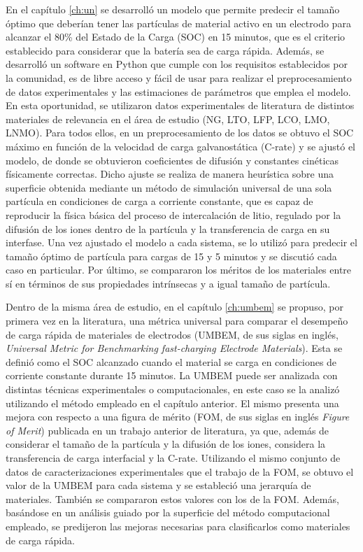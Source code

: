En el capítulo \ref{ch:un} se desarrolló un modelo que permite predecir el tamaño
óptimo que deberían tener las partículas de material activo en un electrodo para 
alcanzar el 80\% del Estado de la Carga (SOC) en 15 minutos, que es el criterio
establecido para considerar que la batería sea de carga rápida. Además, se 
desarrolló un software en Python que cumple con los requisitos establecidos por 
la comunidad, es de libre acceso y fácil de usar para realizar el preprocesamiento
de datos experimentales y las estimaciones de parámetros que emplea el modelo. En esta oportunidad, se 
utilizaron datos experimentales de literatura de distintos materiales de 
relevancia en el área de estudio (NG, LTO, LFP, LCO, LMO, LNMO). Para todos ellos,
en un preprocesamiento de los datos se obtuvo el SOC máximo en función de la 
velocidad de carga galvanostática (C-rate) y se ajustó el modelo, de donde 
se obtuvieron coeficientes de difusión y constantes cinéticas físicamente 
correctas. Dicho ajuste se realiza de manera heurística sobre una superficie 
obtenida mediante un método de simulación universal de una sola partícula en 
condiciones de carga a corriente constante, que es capaz de reproducir la física 
básica del proceso de intercalación de litio, regulado por la difusión de los 
iones dentro de la partícula y la transferencia de carga en su interfase.
Una vez ajustado el modelo a cada sistema, se lo utilizó para predecir el tamaño
óptimo de partícula para cargas de 15 y 5 minutos y se discutió cada caso en 
particular. Por último, se compararon los méritos de los materiales entre sí en 
términos de sus propiedades intrínsecas y a igual tamaño de partícula.

Dentro de la misma área de estudio, en el capítulo \ref{ch:umbem} se propuso, por 
primera vez en la literatura, una métrica universal para comparar el desempeño de 
carga rápida de materiales de electrodos (UMBEM, de sus siglas en inglés, 
\textit{Universal Metric for Benchmarking fast-charging Electrode Materials}). 
Esta se definió como el SOC alcanzado cuando el material se carga 
en condiciones de corriente constante durante 15 minutos. La UMBEM puede ser 
analizada con distintas técnicas experimentales o computacionales, en este caso 
se la analizó utilizando el método empleado en el capítulo anterior. El mismo 
presenta una mejora con respecto a una figura de mérito (FOM, de sus siglas en 
inglés \textit{Figure of Merit}) publicada en un trabajo anterior de literatura,
ya que, además de considerar el tamaño de la partícula y la difusión de los iones, 
considera la transferencia de carga interfacial y la C-rate. Utilizando el mismo 
conjunto de datos de caracterizaciones experimentales que el trabajo de la FOM, se
obtuvo el valor de la UMBEM para cada sistema y se estableció una jerarquía de 
materiales. También se compararon estos valores con los de la FOM. Además,
basándose en un análisis guiado por la superficie del método computacional 
empleado, se predijeron las mejoras necesarias para clasificarlos 
como materiales de carga rápida.

